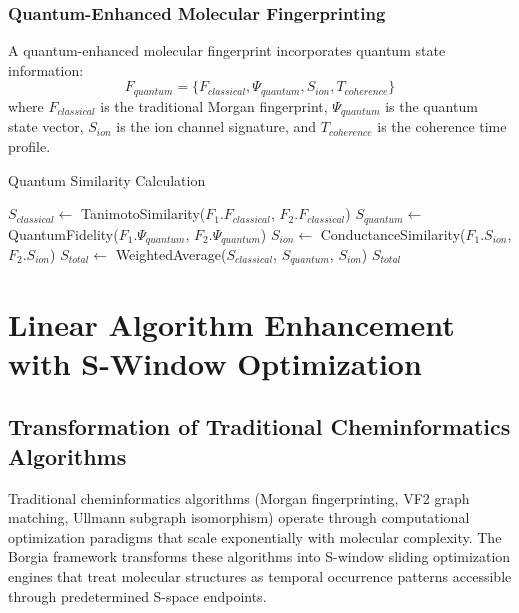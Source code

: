 ﻿\documentclass[11pt,a4paper]{article}
\begin{document}
\subsubsection{Quantum-Enhanced Molecular Fingerprinting}

\begin{definition}
A quantum-enhanced molecular fingerprint incorporates quantum state information:
\begin{equation}
F_{quantum} = \{F_{classical}, \Psi_{quantum}, S_{ion}, T_{coherence}\}
\end{equation}
where $F_{classical}$ is the traditional Morgan fingerprint, $\Psi_{quantum}$ is the quantum state vector, $S_{ion}$ is the ion channel signature, and $T_{coherence}$ is the coherence time profile.
\end{definition}

\begin{algorithm}
\caption{Quantum Similarity Calculation}
\begin{algorithmic}
    \State $S_{classical} \leftarrow$ TanimotoSimilarity($F_1.F_{classical}$, $F_2.F_{classical}$)
    \State $S_{quantum} \leftarrow$ QuantumFidelity($F_1.\Psi_{quantum}$, $F_2.\Psi_{quantum}$)
    \State $S_{ion} \leftarrow$ ConductanceSimilarity($F_1.S_{ion}$, $F_2.S_{ion}$)
    \State $S_{total} \leftarrow$ WeightedAverage($S_{classical}$, $S_{quantum}$, $S_{ion}$)
    \State \Return $S_{total}$
\EndProcedure
\end{algorithmic}
\end{algorithm}

\section{Linear Algorithm Enhancement with S-Window Optimization}

\subsection{Transformation of Traditional Cheminformatics Algorithms}

Traditional cheminformatics algorithms (Morgan fingerprinting, VF2 graph matching, Ullmann subgraph isomorphism) operate through computational optimization paradigms that scale exponentially with molecular complexity. The Borgia framework transforms these algorithms into S-window sliding optimization engines that treat molecular structures as temporal occurrence patterns accessible through predetermined S-space endpoints.
\end{document}
